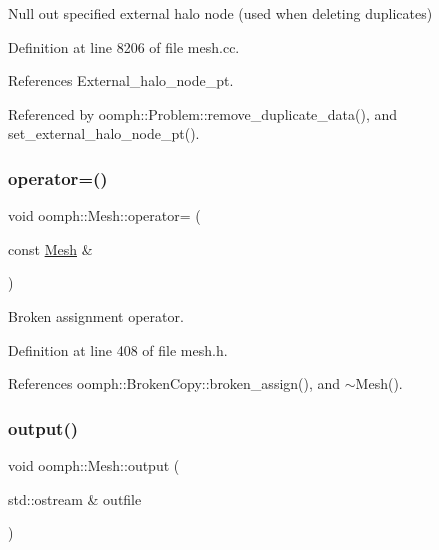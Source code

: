 Null out specified external halo node (used when deleting duplicates) 



Definition at line 8206 of file mesh.\+cc.



References External\+\_\+halo\+\_\+node\+\_\+pt.



Referenced by oomph\+::\+Problem\+::remove\+\_\+duplicate\+\_\+data(), and set\+\_\+external\+\_\+halo\+\_\+node\+\_\+pt().

\mbox{\label{classoomph_1_1Mesh_ad38897eb9c0bcac578381ebd85127c37}} 
\subsubsection{\texorpdfstring{operator=()}{operator=()}}
{\footnotesize\ttfamily void oomph\+::\+Mesh\+::operator= (\begin{DoxyParamCaption}\item[{const \hyperlink{classoomph_1_1Mesh}{Mesh} \&}]{ }\end{DoxyParamCaption})\hspace{0.3cm}{\ttfamily [inline]}}



Broken assignment operator. 



Definition at line 408 of file mesh.\+h.



References oomph\+::\+Broken\+Copy\+::broken\+\_\+assign(), and $\sim$\+Mesh().

\mbox{\label{classoomph_1_1Mesh_aab74388e8e21325f3ca26f1bd99c26f7}} 
\subsubsection{\texorpdfstring{output()}{output()}\hspace{0.1cm}{\footnotesize\ttfamily [1/6]}}
{\footnotesize\ttfamily void oomph\+::\+Mesh\+::output (\begin{DoxyParamCaption}\item[{std\+::ostream \&}]{outfile }\end{DoxyParamCaption})}



